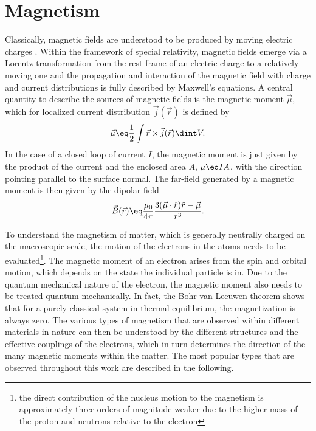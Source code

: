 \documentclass[\main/dresen_thesis.tex]{subfiles}
\begin{document}
\section{Magnetism}\label{ch:theoreticalBackground:magnetism}

  Classically, magnetic fields are understood to be produced by moving electric charges \cite{Jackson_1999_Class, Blundell_2001_Magne}.
  Within the framework of special relativity, magnetic fields emerge via a Lorentz transformation from the rest frame of an electric charge to a relatively moving one and the propagation and interaction of the magnetic field with charge and current distributions is fully described by Maxwell's equations.
  A central quantity to describe the sources of magnetic fields is the magnetic moment $\vec{\mu}$, which for localized current distribution $\vec{j}(\vec{r})$ is defined by
  \begin{align}
    \vec{\mu} \eq \frac{1}{2} \int \vec{r} \times \vec{j}(\vec{r}) \dint V .
  \end{align}
  In the case of a closed loop of current $I$, the magnetic moment is just given by the product of the current and the enclosed area $A$, $\mu \eq I A$, with the direction pointing parallel to the surface normal.
  The far-field generated by a magnetic moment is then given by the dipolar field
  \begin{align}
    \vec{B} (\vec{r}) \eq \frac{\mu_0}{4 \pi} \frac{3(\vec{\mu} \cdot \hat{r})\hat{r} - \vec{\mu}}{r^3}.
  \end{align}

  To understand the magnetism of matter, which is generally neutrally charged on the macroscopic scale, the motion of the electrons in the atoms needs to be evaluated\footnote{the direct contribution of the nucleus motion to the magnetism is approximately three orders of magnitude weaker due to the higher mass of the proton and neutrons relative to the electron}.
  The magnetic moment of an electron arises from the spin and orbital motion, which depends on the state the individual particle is in.
  Due to the quantum mechanical nature of the electron, the magnetic moment also needs to be treated quantum mechanically.
  In fact, the Bohr-van-Leeuwen theorem shows that for a purely classical system in thermal equilibrium, the magnetization is always zero.
  The various types of magnetism that are observed within different materials in nature can then be understood by the different structures and the effective couplings of the electrons, which in turn determines the direction of the many magnetic moments within the matter.
  The most popular types that are observed throughout this work are described in the following.
\end{document}
